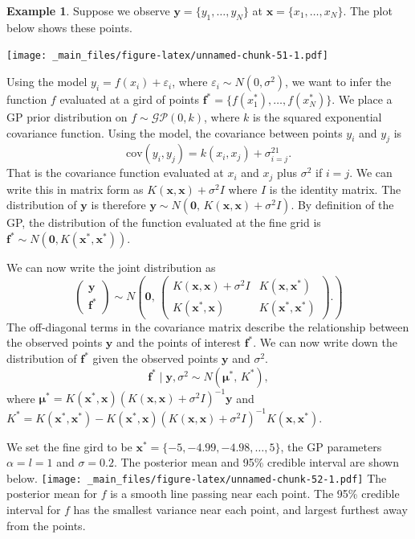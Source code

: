 \documentclass[
]{book}
\theoremstyle{definition}
\theoremstyle{definition}
\newtheorem{example}{Example}[chapter]
\theoremstyle{definition}
\theoremstyle{definition}
\theoremstyle{remark}
\begin{document}
\begin{example}
Suppose we observe \(\boldsymbol{y} = \{y_1, \ldots, y_N\}\) at \(\boldsymbol{x} = \{x_1, \ldots, x_N\}\). The plot below shows these points.

\texttt{[image: \_main\_files/figure-latex/unnamed-chunk-51-1.pdf]}

Using the model \(y_i = f(x_i) + \varepsilon_i\), where \(\varepsilon_i \sim N(0, \sigma^2)\), we want to infer the function \(f\) evaluated at a gird of points \(\boldsymbol{f}^* = \{f(x_1^*), \ldots, f(x_N^*)\}\). We place a GP prior distribution on \(f \sim \mathcal{GP}(0, k)\), where \(k\) is the squared exponential covariance function. Using the model, the covariance between points \(y_i\) and \(y_j\) is
\[
\textrm{cov}(y_i, y_j) = k(x_i, x_j) + \sigma^21_{i=j}.
\]
That is the covariance function evaluated at \(x_i\) and \(x_j\) plus \(\sigma^2\) if \(i = j\). We can write this in matrix form as \(K(\boldsymbol{x}, \boldsymbol{x}) + \sigma^2I\) where \(I\) is the identity matrix. The distribution of \(\boldsymbol{y}\) is therefore \(\boldsymbol{y} \sim N(\boldsymbol{0}, \, K(\boldsymbol{x}, \boldsymbol{x}) + \sigma^2I)\). By definition of the GP, the distribution of the function evaluated at the fine grid is \(\boldsymbol{f}^* \sim N(\boldsymbol{0}, K(\boldsymbol{x}^*, \boldsymbol{x}^*))\).

We can now write the joint distribution as
\[
\begin{pmatrix}
\boldsymbol{y} \\
\boldsymbol{f}^*
\end{pmatrix} \sim N\left(\boldsymbol{0}, \,
\begin{pmatrix}
 K(\boldsymbol{x}, \boldsymbol{x}) + \sigma^2I &  K(\boldsymbol{x}, \boldsymbol{x}^*)\\
K(\boldsymbol{x}^*, \boldsymbol{x}) & K(\boldsymbol{x}^*, \boldsymbol{x}^*)
\end{pmatrix}.
\right)
\]
The off-diagonal terms in the covariance matrix describe the relationship between the observed points \(\boldsymbol{y}\) and the points of interest \(\boldsymbol{f}^*\). We can now write down the distribution of \(\boldsymbol{f}^*\) given the observed points \(\boldsymbol{y}\) and \(\sigma^2\).
\[
\boldsymbol{f}^* \mid \boldsymbol{y}, \sigma^2 \sim N(\boldsymbol{\mu}^*, \, K^*),
\]
where \(\boldsymbol{\mu}^* = K(\boldsymbol{x}^*, \boldsymbol{x})(K(\boldsymbol{x}, \boldsymbol{x}) + \sigma^2 I)^{-1} \boldsymbol{y}\) and \(K^* = K(\boldsymbol{x}^*, \boldsymbol{x}^*) - K(\boldsymbol{x}^*, \boldsymbol{x})(K(\boldsymbol{x}, \boldsymbol{x}) + \sigma^2I)^{-1}K(\boldsymbol{x}, \boldsymbol{x}^*)\).

We set the fine gird to be \(\boldsymbol{x}^* = \{-5, -4.99, -4.98, \ldots, 5\}\), the GP parameters \(\alpha = l = 1\) and \(\sigma = 0.2\). The posterior mean and 95\% credible interval are shown below.
\texttt{[image: \_main\_files/figure-latex/unnamed-chunk-52-1.pdf]}
The posterior mean for \(f\) is a smooth line passing near each point. The 95\% credible interval for \(f\) has the smallest variance near each point, and largest furthest away from the points.
\end{example}
\end{document}

